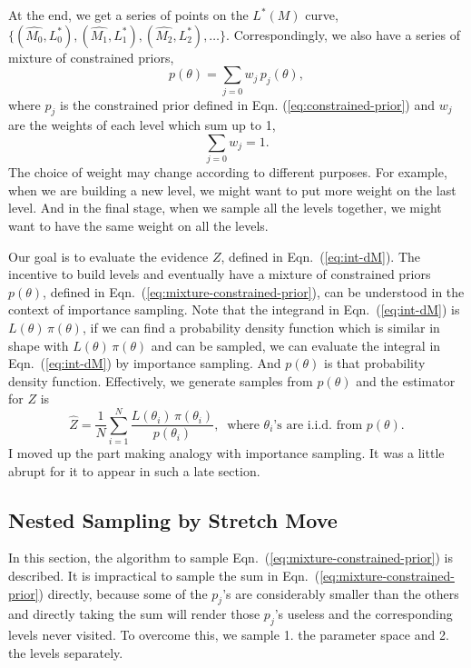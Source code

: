 \documentclass[letterpaper, preprint]{aastex}
\newcommand{\qer}[1]{{\color{red}#1}}
\begin{document}
At the end, we get a series of points on the $L^*(M)$ curve, $\{(\widehat{M_0}, L_0^*),(\widehat{M_1},L_1^*),(\widehat{M_2},L_2^*), \ldots\}$. Correspondingly, we also have a series of mixture of constrained priors,
\begin{equation}
p(\theta) = \sum_{j=0} w_j\,p_{j}(\theta),
\label{eq:mixture-constrained-prior}
\end{equation}
where $p_{j}$ is the constrained prior defined in Eqn. (\ref{eq:constrained-prior})
and $w_j$ are the weights of each level which sum up to 1,
\begin{equation}
\sum_{j=0}w_j = 1.
\label{eq:weight-sum-1}
\end{equation}
The choice of weight may change according to different purposes. For example, when we are building a new level, we might want to put more weight on the last level. And in the final stage, when we sample all the levels together, we might want to have the same weight on all the levels.

Our goal is to evaluate the evidence $Z$, defined in Eqn.~(\ref{eq:int-dM}). The incentive to build levels and eventually have a mixture of constrained priors $p(\theta)$, defined in Eqn.~(\ref{eq:mixture-constrained-prior}), can be understood in the context of importance sampling. Note that  the integrand in Eqn.~(\ref{eq:int-dM}) is $L(\theta)\,\pi(\theta)$, if we can find a probability density function which is similar in shape with $L(\theta)\,\pi(\theta)$ and can be sampled, we can evaluate the integral in Eqn.~(\ref{eq:int-dM}) by importance sampling. And $p(\theta)$ is that probability density function. Effectively, we generate samples from $p(\theta)$ and the estimator for $Z$ is
\begin{equation}
\hat{Z}=\frac{1}{N}\sum_{i=1}^N\frac{L(\theta_i)\,\pi(\theta_i)}{p(\theta_i)},\;\;\mbox{where $\theta_i$'s are i.i.d. from $p(\theta)$.}
\label{eq:importance-sampling}
\end{equation}
\qer{I moved up the part making analogy with importance sampling. It was a little abrupt for it to appear in such a late section.}

\subsection{Nested Sampling by Stretch Move}
\label{sec:algorithm}
In this section, the algorithm to sample Eqn.~(\ref{eq:mixture-constrained-prior}) is described. It is impractical to sample the sum in Eqn.~(\ref{eq:mixture-constrained-prior}) directly, because some of the $p_{j}$'s are considerably smaller than the others and directly taking the sum will render those $p_{j}$'s useless and the corresponding levels never visited. To overcome this, we sample 1. the parameter space and 2. the levels separately. 
\end{document}

